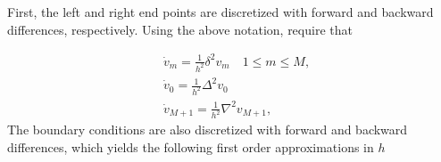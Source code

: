 







First, the left and right end points are discretized with forward and backward differences, respectively. Using the above notation, require that 

\begin{equation}
\begin{split}
     &\dot{v}_m = \frac{1}{h^2} \delta^2 v_m \quad 1 \le m \le M, \\
     &\dot{v}_0 = \frac{1}{h^2}\Delta^2v_0 \\
     &\dot{v}_{M+1} = \frac{1}{h^2}\nabla^2v_{M+1}, 
\label{diff1}
\end{split}
\end{equation} 
The boundary conditions are also discretized with forward and backward differences, which yields the following first order approximations in $h$

